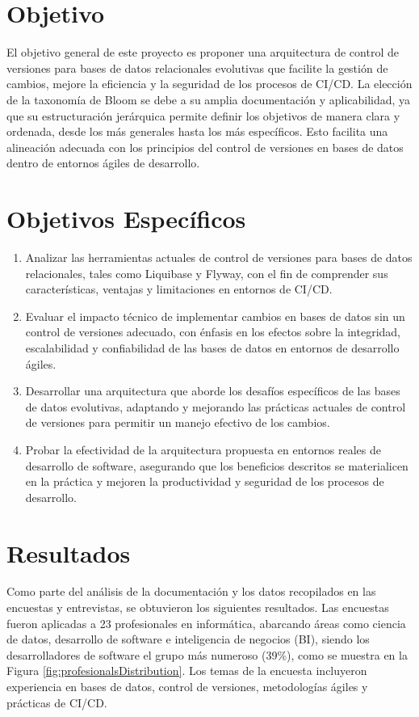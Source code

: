 \documentclass{IEEEtran}
\begin{document}
\section{Objetivo}
El objetivo general de este proyecto es proponer una arquitectura de control de versiones para bases de datos relacionales evolutivas que facilite la gestión de cambios, mejore la eficiencia y la seguridad de los procesos de CI/CD. La elección de la taxonomía de Bloom \cite{TBloom} se debe a su amplia documentación y aplicabilidad, ya que su estructuración jerárquica permite definir los objetivos de manera clara y ordenada, desde los más generales hasta los más específicos. Esto facilita una alineación adecuada con los principios del control de versiones en bases de datos dentro de entornos ágiles de desarrollo.

\section{Objetivos Específicos}
\begin{enumerate}
    \item Analizar las herramientas actuales de control de versiones para bases de datos relacionales, tales como Liquibase y Flyway, con el fin de comprender sus características, ventajas y limitaciones en entornos de CI/CD.
    \item Evaluar el impacto técnico de implementar cambios en bases de datos sin un control de versiones adecuado, con énfasis en los efectos sobre la integridad, escalabilidad y confiabilidad de las bases de datos en entornos de desarrollo ágiles.
    \item Desarrollar una arquitectura que aborde los desafíos específicos de las bases de datos evolutivas, adaptando y mejorando las prácticas actuales de control de versiones para permitir un manejo efectivo de los cambios.
    \item Probar la efectividad de la arquitectura propuesta en entornos reales de desarrollo de software, asegurando que los beneficios descritos se materialicen en la práctica y mejoren la productividad y seguridad de los procesos de desarrollo.
\end{enumerate}

\section{Resultados}
Como parte del análisis de la documentación y los datos recopilados en las encuestas y entrevistas, se obtuvieron los siguientes resultados. Las encuestas fueron aplicadas a 23 profesionales en informática, abarcando áreas como ciencia de datos, desarrollo de software e inteligencia de negocios (BI), siendo los desarrolladores de software el grupo más numeroso (39\%), como se muestra en la Figura \ref{fig:profesionalsDistribution}. Los temas de la encuesta incluyeron experiencia en bases de datos, control de versiones, metodologías ágiles y prácticas de CI/CD.
\end{document}

